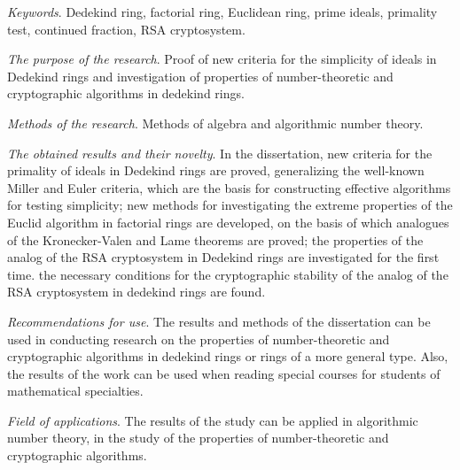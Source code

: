 \documentclass[_00_autoref.tex]{subfiles}
\begin{document}
\textit{Keywords}.
Dedekind ring, factorial ring, Euclidean ring, prime ideals, primality test, continued fraction, RSA cryptosystem.

\textit{The purpose of the research}.
Proof of new criteria for the simplicity of ideals in Dedekind rings and investigation of properties of number-theoretic and cryptographic algorithms in dedekind rings.

\textit{Methods of the research}.
Methods of algebra and algorithmic number theory.

\textit{The obtained results and their novelty}.
In the dissertation, new criteria for the primality of ideals in Dedekind rings are proved, generalizing the well-known Miller and Euler criteria, which are the basis for constructing effective algorithms for testing simplicity; new methods for investigating the extreme properties of the Euclid algorithm in factorial rings are developed, on the basis of which analogues of the Kronecker-Valen and Lame theorems are proved; the properties of the analog of the RSA cryptosystem in Dedekind rings are investigated for the first time. the necessary conditions for the cryptographic stability of the analog of the RSA cryptosystem in dedekind rings are found.

\textit{Recommendations for use}.
The results and methods of the dissertation can be used in conducting research on the properties of number-theoretic and cryptographic algorithms in dedekind rings or rings of a more general type.
Also, the results of the work can be used when reading special courses for students of mathematical specialties.

\textit{Field of applications}.
The results of the study can be applied in algorithmic number theory, in the study of the properties of number-theoretic and cryptographic algorithms.
\end{document}
